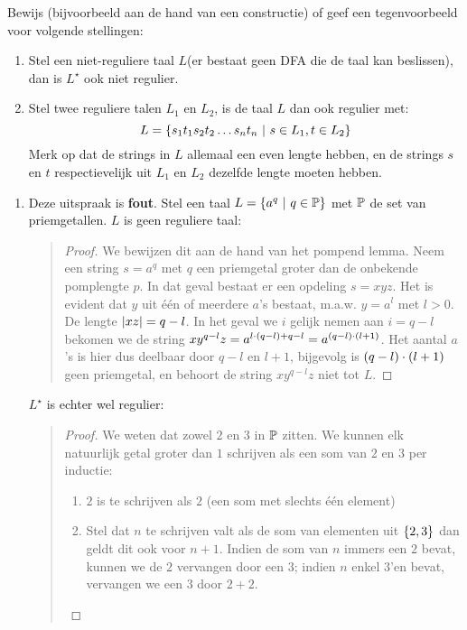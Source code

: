 \documentclass{article}
\begin{document}
\begin{question}
Bewijs (bijvoorbeeld aan de hand van een constructie) of geef een tegenvoorbeeld voor volgende stellingen:
\begin{enumerate}
 \item Stel een niet-reguliere taal $L$(er bestaat geen DFA die de taal kan beslissen), dan is $L^{\star}$ ook niet regulier.
 \item Stel twee reguliere talen $L_1$ en $L_2$, is de taal $L$ dan ook regulier met:
 \begin{equation}
  L=\left\{ s_1t_1s_2t_2\ldots s_nt_n\ |\ s\in L_1,t\in L_2 \right\}
 \end{equation}
 Merk op dat de strings in $L$ allemaal een even lengte hebben, en de strings $s$ en $t$ respectievelijk uit $L_1$ en $L_2$ dezelfde lengte moeten hebben.
\end{enumerate}
\begin{answer}
\begin{enumerate}
 \item Deze uitspraak is \textbf{fout}. Stel een taal $L=\left\{ a^q\ |\ q\in\mathbb{P} \right\}$ met $\mathbb{P}$ de set van priemgetallen. $L$ is geen reguliere taal:
 \begin{quote}
 \begin{proof}
 We bewijzen dit aan de hand van het pompend lemma. Neem een string $s=a^q$ met $q$ een priemgetal groter dan de onbekende pomplengte $p$. In dat geval bestaat er een opdeling $s=xyz$. Het is evident dat $y$ uit \'e\'en of meerdere $a$'s bestaat, m.a.w. $y=a^l$ met $l>0$. De lengte $\left|xz\right|=q-l$. In het geval we $i$ gelijk nemen aan $i=q-l$ bekomen we de string $xy^{q-l}z=a^{l\cdot\left( q-l \right)+q-l}=a^{\left( q-l \right)\cdot\left( l+1 \right)}$. Het aantal $a$'s is hier dus deelbaar door $q-l$ en $l+1$, bijgevolg is $\left( q-l \right)\cdot\left( l+1 \right)$ geen priemgetal, en behoort de string $xy^{q-l}z$ niet tot $L$.
 \end{proof}
 \end{quote}
 $L^{\star}$ is echter wel regulier:
 \begin{quote}
 \begin{proof}
 We weten dat zowel $2$ en $3$ in $\mathbb{P}$ zitten. We kunnen elk natuurlijk getal groter dan $1$ schrijven als een som van $2$ en $3$ per inductie:
 \begin{enumerate}
  \item $2$ is te schrijven als $2$ (een som met slechts \'e\'en element)
  \item Stel dat $n$ te schrijven valt als de som van elementen uit $\left\{ 2,3 \right\}$ dan geldt dit ook voor $n+1$. Indien de som van $n$ immers een $2$ bevat, kunnen we de $2$ vervangen door een $3$; indien $n$ enkel $3$'en bevat, vervangen we een $3$ door $2+2$.

\end{enumerate}
\end{proof}
\end{quote}
\end{enumerate}
\end{answer}
\end{question}
\end{document}
